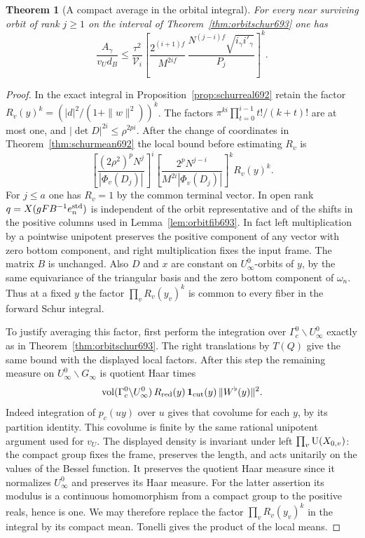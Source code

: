 \documentclass[a4paper,11pt]{article}
\newtheorem{theorem}[proposition]{Theorem}
\theoremstyle{definition}
\theoremstyle{remark}
\numberwithin{equation}{section}
\begin{document}
\begin{theorem}[A compact average in the orbital integral]\leavevmode
\label{thm:rotatedorbit694}
For every near surviving orbit of rank \(j\ge1\) on the
interval of Theorem~\ref{thm:orbitschur693} one has
\[
 \frac{A_\gamma}{v_U d_B}
 \le \frac{\tau^2}{\mathcal V_i}
       \left[\frac{2^{(i+1)f}}{M^{2if}}\,
                  \frac{N^{(j-i)f}\sqrt{i_\gamma i'_\gamma}}{P_j}
       \right]^k .
\]
\end{theorem}
\begin{proof}
In the exact integral in Proposition~\ref{prop:schurreal692}
retain the factor
\(R_v(y)^k=(|d|^2/(1+\|w\|^2))^k\). The factors
\(\pi^{ki}\prod_{t=0}^{i-1}t!/(k+t)!\) are at most one,
and \(|\det D|^{2i}\le\rho^{2pi}\). After the change of
coordinates in Theorem~\ref{thm:schurmean692} the local bound
before estimating \(R_v\) is
\[
 \left[\frac{(2\rho^2)^pN^j}{|\Phi_v(D_j)|}\right]^i
 \left[\frac{2^p N^{j-i}}{M^{2i}|\Phi_v(D_j)|}\right]^k R_v(y)^k .
\]
For \(j\le a\) one has \(R_v=1\) by the common terminal vector.
In open rank \(q=X(gF B^{-1}e_n^{\rm std})\) is independent
of the orbit representative and of the shifts in the positive
columns used in Lemma~\ref{lem:orbitfib693}. In fact left
multiplication by a pointwise unipotent preserves the positive
component of any vector with zero bottom component, and right
multiplication fixes the input frame. The matrix \(B\) is
unchanged. Also \(D\) and \(x\) are constant on
\(U_\infty^0\)-orbits of \(y\), by the same equivariance of
the triangular basis and the zero bottom component of
\(\omega_n\). Thus at a fixed \(y\) the factor
\(\prod_v R_v(y_v)^k\) is common to every fiber in the forward
Schur integral.

To justify averaging this factor, first perform the integration
over \(\Gamma_c^0\backslash U_\infty^0\) exactly as in
Theorem~\ref{thm:orbitschur693}. The right translations by
\(T(Q)\) give the same bound with the displayed local factors.
After this step the remaining measure on
\(U_\infty^0\backslash G_\infty\) is quotient Haar times
\[
  \operatorname{vol}(\Gamma_c^0\backslash U_\infty^0)\,
         R_{\rm red}(y)\,{\bf1}_{\rm cut}(y)\,\|W^\flat(y)\|^2 .
\]
Indeed integration of \(p_c(u y)\) over \(u\) gives that
covolume for each \(y\), by its partition identity. This
covolume is finite by the same rational unipotent argument
used for \(v_U\). The displayed density is invariant under
left \(\prod_v{\rm U}(X_{0,v})\): the compact group fixes the
frame, preserves the length, and acts unitarily on the
values of the Bessel function. It preserves the quotient
Haar measure since it normalizes \(U_\infty^0\) and preserves
its Haar measure. For the latter assertion its modulus is a
continuous homomorphism from a compact group to the positive
reals, hence is one. We may therefore replace the factor
\(\prod_v R_v(y_v)^k\) in the integral by its compact mean.
Tonelli gives the product of the local means.


\end{proof}
\end{document}
